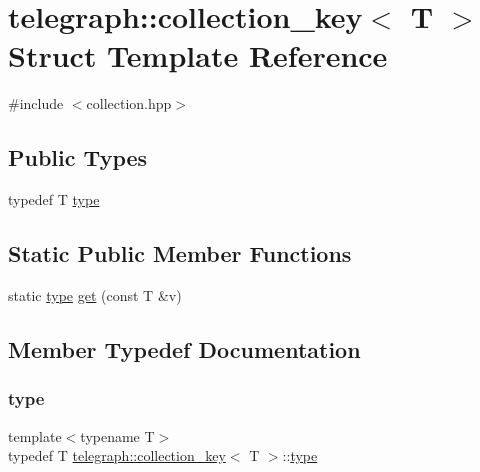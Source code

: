 \hypertarget{structtelegraph_1_1collection__key}{}\section{telegraph\+:\+:collection\+\_\+key$<$ T $>$ Struct Template Reference}
\label{structtelegraph_1_1collection__key}


{\ttfamily \#include $<$collection.\+hpp$>$}

\subsection*{Public Types}
\begin{DoxyCompactItemize}
\item 
typedef T \hyperlink{structtelegraph_1_1collection__key_a8f170ae277cbff0e224232c6f909a945}{type}
\end{DoxyCompactItemize}
\subsection*{Static Public Member Functions}
\begin{DoxyCompactItemize}
\item 
static \hyperlink{structtelegraph_1_1collection__key_a8f170ae277cbff0e224232c6f909a945}{type} \hyperlink{structtelegraph_1_1collection__key_a997f4a2971254f1ba4eebb900ce9d25c}{get} (const T \&v)
\end{DoxyCompactItemize}


\subsection{Member Typedef Documentation}
\mbox{\label{structtelegraph_1_1collection__key_a8f170ae277cbff0e224232c6f909a945}} 
\subsubsection{\texorpdfstring{type}{type}}
{\footnotesize\ttfamily template$<$typename T$>$ \\
typedef T \hyperlink{structtelegraph_1_1collection__key}{telegraph\+::collection\+\_\+key}$<$ T $>$\+::\hyperlink{structtelegraph_1_1collection__key_a8f170ae277cbff0e224232c6f909a945}{type}}



